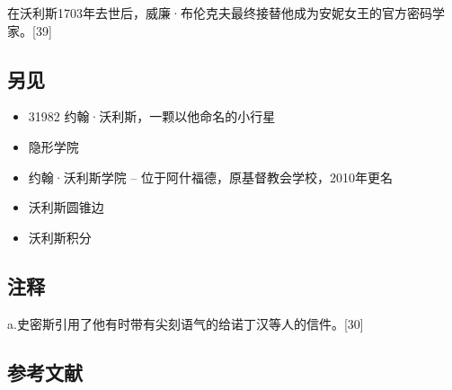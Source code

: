 在沃利斯1703年去世后，威廉·布伦克夫最终接替他成为安妮女王的官方密码学家。[39]
\subsection{另见}
\begin{itemize}
\item 31982 约翰·沃利斯，一颗以他命名的小行星
\item 隐形学院
\item 约翰·沃利斯学院 – 位于阿什福德，原基督教会学校，2010年更名
\item 沃利斯圆锥边
\item 沃利斯积分
\end{itemize}
\subsection{注释}
a.史密斯引用了他有时带有尖刻语气的给诺丁汉等人的信件。[30]
\subsection{参考文献}

